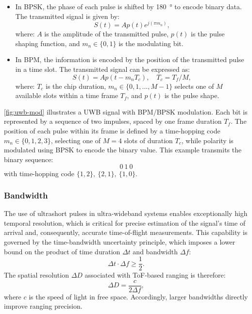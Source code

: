 \begin{itemize}
    \item In BPSK, the phase of each pulse is shifted by \SI{180}{\degree} to encode binary data. The transmitted signal is given by:
    \begin{equation}
    S(t) = A p(t) e^{j (\pi m_n)},
    \end{equation}
    where: $A$ is the amplitude of the transmitted pulse, $p(t)$ is the pulse shaping function, and $m_n \in \{0, 1\}$ is the modulating bit.

    \item In BPM, the information is encoded by the position of the transmitted pulse in a time slot. The transmitted signal can be expressed as:
    \begin{equation}
    S(t) = A p\left(t - m_n T_c\right), \quad T_c = T_f / M,
    \end{equation}
    where: $T_c$ is the chip duration, $m_n \in \{0, 1, \dots, M-1\}$ selects one of $M$ available slots within a time frame $T_f$, and $p(t)$ is the pulse shape.
\end{itemize}

\autoref{fig:uwb-mod} illustrates a UWB signal with BPM/BPSK modulation. Each bit is represented by a sequence of two impulses, spaced by one frame duration $T_f$. The position of each pulse within its frame is defined by a time-hopping code  $m_n \in \{0, 1, 2, 3\}$, selecting one of $M = 4$ slots of duration $T_c$, while polarity is modulated using BPSK to encode the binary value. This example transmits the binary sequence:  
$$
\boxed{0\ 1\ 0}
$$ 
with time-hopping code $\{1, 2\},\ \{2, 1\},\ \{1, 0\}.$ 

\subsubsection{Bandwidth}
The use of ultrashort pulses in ultra-wideband systems enables exceptionally high temporal resolution, which is critical for precise estimation of the signal's time of arrival and, consequently, accurate time-of-flight measurements. This capability is governed by the time-bandwidth uncertainty principle, which imposes a lower bound on the product of time duration $\Delta t$ and bandwidth $\Delta f$:
\begin{equation} 
\Delta t \cdot \Delta f \geq \frac{1}{2}. 
\end{equation}
The spatial resolution $\Delta D$ associated with ToF-based ranging is therefore:
\begin{equation} 
\Delta D = \frac{c}{2\Delta f}, 
\end{equation}
where $c$ is the speed of light in free space. Accordingly, larger bandwidths directly improve ranging precision.


